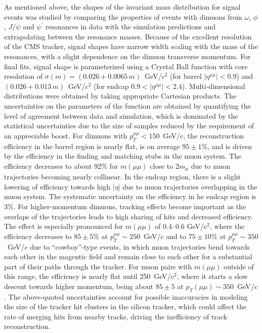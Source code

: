 As mentioned above, the shapes of the invariant mass distribution for signal events was studied by comparing the properties of events with dimuons from $\omega$, $\phi$, $J/\psi$ and $\psi^{\prime}$ resonances in data with the simulation predictions and extrapolating between the resonance masses. Because of the excellent resolution of the CMS tracker, signal shapes have narrow width scaling with the mass of the resonances, with a slight dependence on the dimuon transverse momentum. For final fits, signal shape is parameterized using a Crystal Ball function with core resolution of $\sigma(m) = (0.026 + 0.0065\, m )$~GeV/$c^2$ (for barrel $|\eta^{\mu\mu}| < 0.9$) and $(0.026 + 0.013\, m )$~GeV/$c^2$ (for endcap $0.9 < |\eta^{\mu\mu}| < 2.4$). Multi-dimensional distributions were obtained by taking appropriate Cartesian products. The uncertainties on the parameters of the function are obtained by quantifying the level of agreement between data and simulation, which is dominated by the statistical uncertainties due to the size of samples reduced by the requirement of an appreciable boost. For dimuons with $p_T^{\mu\mu}<150$~GeV/$c$, the reconstruction efficiency in the barrel region is nearly flat, is on average $95 \pm 1$\%, and is driven by the efficiency in the finding and matching stubs in the muon system. The efficiency decreases to about 92\% for $m(\mu\mu)$ close to $2m_\mu$ due to muon trajectories becoming nearly collinear. In the endcap region, there is a slight lowering of efficiency towards high $|\eta|$ due to muon trajectories overlapping in the muon system. The systematic uncertainty on the efficiency in he endcap region is 3\%. For higher-momentum dimuons, tracking effects become important as the overlaps of the trajectories leads to high sharing of hits and decreased efficiency. The effect is especially pronounced for $m(\mu\mu)$ of 0.4--0.6 GeV/c$^2$, where the efficiency decreases to $85\pm 5$\% at $p_T^{\mu\mu}\sim 250$~GeV/$c$ and to $75\pm 10$\% at $p_T^{\mu\mu}\sim 350$~GeV/$c$ due to ``cowboy''-type events, in which muon trajectories bend towards each other in the magentic field and remain close to each other for a substantial part of their paths through the tracker. For muon pairs with $m(\mu\mu)$ outside of this range, the efficiency is nearly flat until 250~GeV/c$^2$, where it starts a slow descent towards higher momentum, being about $85\pm5$ at $p_T(\mu\mu)\sim350$~GeV/$c$. The above-quoted uncertainties account for possible inaccuracies in modeling the size of the tracker hit clusters in the silicon tracker, which could affect the rate of merging hits from nearby tracks, driving the inefficiency of track reconstruction.

